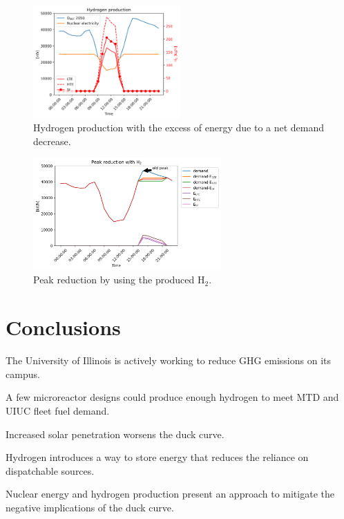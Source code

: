\documentclass[11pt,letterpaper]{article}
\begin{document}
	\begin{figure}[htbp!]
	    \centering
		\includegraphics[height=4.3cm]{figures/uiuc-hydro2B}
		\hfill
		\caption{Hydrogen production with the excess of energy due to a net demand decrease.}
		\label{fig:uiuc-duck2}
	\end{figure}

	\begin{figure}[htbp!]
	    \centering
		\includegraphics[height=4.3cm]{figures/uiuc-hydro3B}
		\hfill
		\caption{Peak reduction by using the produced H$_2$.}
		\label{fig:uiuc-duck3}
	\end{figure}




\section{Conclusions}

The University of Illinois is actively working to reduce GHG emissions on its campus.

A few microreactor designs could produce enough hydrogen to meet MTD and UIUC fleet fuel demand.

Increased solar penetration worsens the duck curve.

Hydrogen introduces a way to store energy that reduces the reliance on dispatchable sources.

Nuclear energy and hydrogen production present an approach to mitigate the negative implications of the duck curve.


\pagebreak


\end{document}
